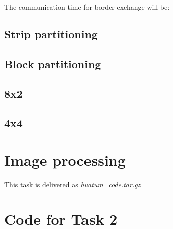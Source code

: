 \documentclass[english,a4paper,numbers=noenddot]{scrartcl}
\begin{document}
The communication time for border exchange will be:
\subsection{Strip partitioning}
\subsection{Block partitioning}
\subsection{8x2}
\subsection{4x4}

\section{Image processing}
This task is delivered as \emph{hvatum\_code.tar.gz}

\newpage
\appendix
\section{Code for Task 2}
\label{code}

\end{document}
